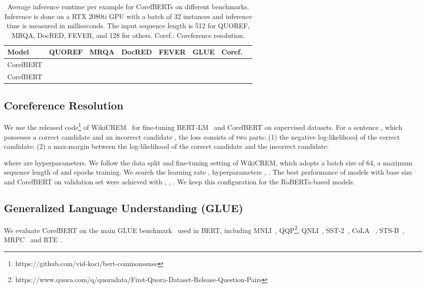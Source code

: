 \documentclass[11pt,a4paper]{article}
\newcommand\CorefBERT{CorefBERT\xspace}
\newcommand\BASESIZE{\xspace}
\newcommand\LARGESIZE{\xspace}
\begin{document}
\begin{table*}[!t]
\small
\centering
\begin{tabular}{l c c c c c c c}
\toprule
Model  & QUOREF & MRQA & DocRED & FEVER & GLUE & Coref.\\
\midrule
CorefBERT\BASESIZE &   &    &  &  &  & \\
CorefBERT\LARGESIZE &   &   & &  &  & \\
\bottomrule
\end{tabular}
\caption{Average inference runtime per example for CorefBERTs on different benchmarks. Inference is done on a RTX 2080ti GPU with a batch of 32 instances and inference time is measured in milliseconds.  The input sequence length is 512 for QUOREF, MRQA, DocRED, FEVER, and 128 for others. Coref.: Coreference resolution. }
\label{average_runtime}
\end{table*}


\subsection{Coreference Resolution}

We use the released code\footnote{https://github.com/vid-koci/bert-commonsense} of WikiCREM~\citep{wikicrem} for fine-tuning BERT-LM~\citep{ASimpleMethodforCommonsenseReasoning} and \CorefBERT on supervised datasets. For a sentence , which possesses a correct candidate  and an incorrect candidate , the loss consists of two parts: (1) the negative log-likelihood of the correct candidate; (2) a max-margin between the log-likelihood of the correct candidate and the incorrect candidate:

where  are hyperparameters. We follow the data split and fine-tuning setting of WikiCREM, which adopts a batch size of 64, a  maximum sequence length of  and  epochs training. We search the learning rate , hyperparameters , . The best performance of models with base size and CorefBERT\LARGESIZE on validation set were achieved with , , . We keep this configuration for the RoBERTa-based models.

\subsection{Generalized Language Understanding (GLUE)}


We evaluate \CorefBERT on the main GLUE benchmark~\citep{GLUE} used in BERT, including MNLI~\citep{MNLI}, QQP\footnote{https://www.quora.com/q/quoradata/First-Quora-Dataset-Release-Question-Pairs}, QNLI~\citep{rajpurkar2016squad}, SST-2~\citep{SST-2}, CoLA~\citep{CoLA} ,  STS-B~\citep{STS-B}, MRPC~\citep{MRPC} and RTE~\citep{RTE}.
\end{document}
